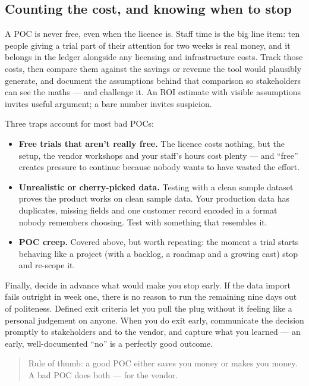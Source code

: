 \subsection{Counting the cost, and knowing when to stop}


A POC is never free, even when the licence is. Staff time is the big line item: ten people giving a trial part of their attention for two weeks is real money, and it belongs in the ledger alongside any licensing and infrastructure costs. Track those costs, then compare them against the savings or revenue the tool would plausibly generate, and document the assumptions behind that comparison so stakeholders can see the maths — and challenge it. An ROI estimate with visible assumptions invites useful argument; a bare number invites suspicion.


Three traps account for most bad POCs:


\begin{itemize}[leftmargin=*]
\item \textbf{Free trials that aren't really free.} The licence costs nothing, but the setup, the vendor workshops and your staff's hours cost plenty — and ``free'' creates pressure to continue because nobody wants to have wasted the effort.
\item \textbf{Unrealistic or cherry-picked data.} Testing with a clean sample dataset proves the product works on clean sample data. Your production data has duplicates, missing fields and one customer record encoded in a format nobody remembers choosing. Test with something that resembles it.
\item \textbf{POC creep.} Covered above, but worth repeating: the moment a trial starts behaving like a project (with a backlog, a roadmap and a growing cast) stop and re-scope it.
\end{itemize}

Finally, decide in advance what would make you stop early. If the data import fails outright in week one, there is no reason to run the remaining nine days out of politeness. Defined exit criteria let you pull the plug without it feeling like a personal judgement on anyone. When you do exit early, communicate the decision promptly to stakeholders and to the vendor, and capture what you learned — an early, well-documented ``no'' is a perfectly good outcome.



\begin{quote}\small
Rule of thumb: a good POC either saves you money or makes you money. A bad POC does both — for the vendor.
\end{quote}


